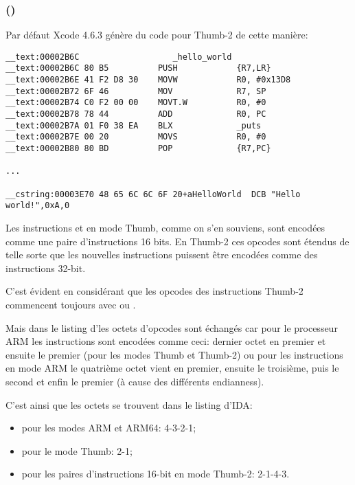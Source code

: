 \subsubsection{\OptimizingXcodeIV (\ThumbTwoMode)}

Par défaut Xcode 4.6.3 génère du code pour Thumb-2 de cette manière:

\begin{lstlisting}[caption=\OptimizingXcodeIV (\ThumbTwoMode),style=customasmARM]
__text:00002B6C                   _hello_world
__text:00002B6C 80 B5          PUSH            {R7,LR}
__text:00002B6E 41 F2 D8 30    MOVW            R0, #0x13D8
__text:00002B72 6F 46          MOV             R7, SP
__text:00002B74 C0 F2 00 00    MOVT.W          R0, #0
__text:00002B78 78 44          ADD             R0, PC
__text:00002B7A 01 F0 38 EA    BLX             _puts
__text:00002B7E 00 20          MOVS            R0, #0
__text:00002B80 80 BD          POP             {R7,PC}

...

__cstring:00003E70 48 65 6C 6C 6F 20+aHelloWorld  DCB "Hello world!",0xA,0
\end{lstlisting}


\myindex{\ThumbTwoMode}

Les instructions  et  en mode Thumb, comme on s'en souviens, sont
encodées comme une paire d'instructions 16 bits.
En Thumb-2 ces opcodes  sont étendus de telle sorte que les nouvelles
instructions puissent être encodées comme des instructions 32-bit.

C'est évident en considérant que les opcodes des instructions Thumb-2 commencent
toujours avec  ou .

Mais dans le listing d'\IDA les octets d'opcodes sont échangés car pour le processeur
ARM les instructions sont encodées comme ceci:
dernier octet en premier et ensuite le premier (pour les modes Thumb et Thumb-2)
ou pour les instructions en mode ARM le quatrième octet vient en premier, ensuite
le troisième, puis le second et enfin le premier (à cause des différents \gls{endianness}).

C'est ainsi que les octets se trouvent dans le listing d'IDA:
\begin{itemize}
\item pour les modes ARM et ARM64: 4-3-2-1;
\item pour le mode Thumb: 2-1;
\item pour les paires d'instructions 16-bit en mode Thumb-2: 2-1-4-3.
\end{itemize}

